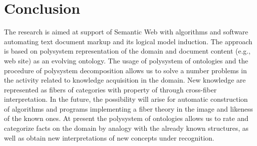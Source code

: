 \documentclass[conference]{IEEEtran}
\begin{document}
%





\section{Conclusion}

The research is aimed at support of Semantic Web with algorithms and
software automating text document markup and its logical model
induction.  The approach is based on polysystem representation of the
domain and document content (e.g., web site) as an evolving ontology.
The usage of polysystem of ontologies and the procedure of polysystem
decomposition \cite{father} allows us to solve a number problems in
the activity related to knowledge acquisition in the domain.  New
knowledge are represented as fibers of categories with property of
through cross-fiber interpretation.  In the future, the possibility
will arise for automatic construction of algorithms and programs
implementing a fiber theory in the image and likeness of the known
ones.  At present the polysystem of ontologies allows us to rate and
categorize facts on the domain by analogy with the already known
structures, as well as obtain new interpretations of new concepts
under recognition.
\end{document}
